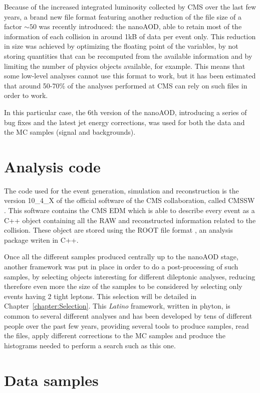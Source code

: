 \documentclass[a4paper, 10pt, openright]{report}
\begin{document}
Because of the increased integrated luminosity collected by \ac{CMS} over the last few years, a brand new file format featuring another reduction of the file size of a factor $\sim 50$ was recently introduced: the nanoAOD, able to retain most of the information of each collision in around 1kB of data per event only. This reduction in size was achieved by optimizing the floating point of the variables, by not storing quantities that can be recomputed from the available information and by limiting the number of physics objects available, for example. This means that some low-level analyses cannot use this format to work, but it has been estimated that around 50-70\% of the analyses performed at \ac{CMS} can rely on such files in order to work. 

In this particular case, the 6th version of the nanoAOD, introducing a series of bug fixes and the latest jet energy corrections, was used for both the data and the \ac{MC} samples (signal and backgrounds). 

\section{Analysis code} \label{section:Code}

The code used for the event generation, simulation and reconstruction is the version 10\_4\_X of the official software of the \ac{CMS} collaboration, called CMSSW \cite{CMSSW}. This software contains the \ac{CMS} \ac{EDM} which is able to describe every event as a C++ object containing all the RAW and reconstructed information related to the collision. These object are stored using the ROOT file format \cite{ROOT}, an analysis package writen in C++. 

Once all the different samples produced centrally up to the nanoAOD stage, another framework was put in place in order to do a post-processing of such samples, by selecting objects interesting for different dileptonic analyses, reducing therefore even more the size of the samples to be considered by selecting only events having 2 tight leptons. This selection will be detailed in Chapter~\ref{chapter:Selection}. This \textit{Latino} framework, written in phyton, is common to several different analyses and has been developed by tens of different people over the past few years, providing several tools to produce samples, read the files, apply different corrections to the \ac{MC} samples and produce the histograms needed to perform a search such as this one.

\section{Data samples} \label{section:Data}
\end{document}
